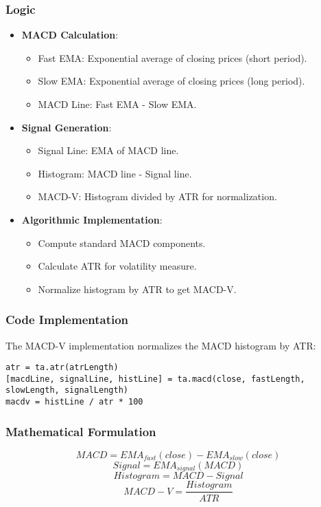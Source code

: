 \documentclass[12pt]{article}
\begin{document}
\subsubsection{Logic}
\begin{itemize}
\item \textbf{MACD Calculation}:
  \begin{itemize}
  \item Fast EMA: Exponential average of closing prices (short period).
  \item Slow EMA: Exponential average of closing prices (long period).
  \item MACD Line: Fast EMA - Slow EMA.
  \end{itemize}
\item \textbf{Signal Generation}:
  \begin{itemize}
  \item Signal Line: EMA of MACD line.
  \item Histogram: MACD line - Signal line.
  \item MACD-V: Histogram divided by ATR for normalization.
  \end{itemize}
\item \textbf{Algorithmic Implementation}:
  \begin{itemize}
  \item Compute standard MACD components.
  \item Calculate ATR for volatility measure.
  \item Normalize histogram by ATR to get MACD-V.
  \end{itemize}
\end{itemize}

\subsubsection{Code Implementation}
The MACD-V implementation normalizes the MACD histogram by ATR:

\begin{lstlisting}[language=Pine, caption=Pine Script Code for MACD-V Calculation]
atr = ta.atr(atrLength)
[macdLine, signalLine, histLine] = ta.macd(close, fastLength, slowLength, signalLength)
macdv = histLine / atr * 100
\end{lstlisting}

\subsubsection{Mathematical Formulation}
\[
MACD = EMA_{fast}(close) - EMA_{slow}(close)
\]
\[
Signal = EMA_{signal}(MACD)
\]
\[
Histogram = MACD - Signal
\]
\[
MACD-V = \frac{Histogram}{ATR}
\]
\end{document}
